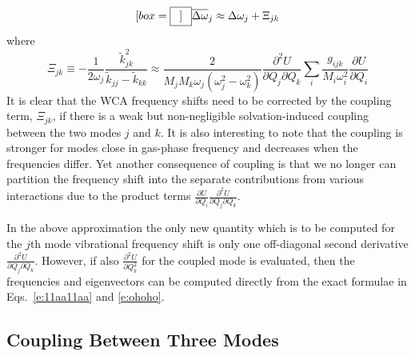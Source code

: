 \documentclass[b5paper,oneside,fleqn,11pt]{book}
\newcommand*{\widebox}[2][0.5em]{\fbox{\hspace{#1}$\displaystyle #2$\hspace{#1}}}
\newcommand{\fderiv}[2]{\ensuremath{
    \frac{\partial #1}{\partial #2}}}
\newcommand{\sderiv}[2]{\ensuremath{
    \frac{\partial^2 #1}{\partial #2^2}
    }}
\newcommand{\sderivd}[3]{\ensuremath{
    \frac{\partial^2 #1}{\partial #2 \partial #3}
    }}
\begin{document}
\begin{refsection}
\begin{equation}[box=\widebox]
   \overline{\Delta\omega}_j \approx \Delta\omega_j + \Xi_{jk}
\end{equation}
%
where
%
\begin{equation}
 \Xi_{jk} \equiv -\frac{1}{2\omega_j} \frac{\tilde{k}_{jk}^2}{\tilde{k}_{jj} - \tilde{k}_{kk}}
 \approx \frac{2}{M_jM_k\omega_j\left(\omega_j^2 - \omega_k^2\right)} \sderivd{U}{Q_j}{Q_k}
 \sum_i \frac{g_{ijk}}{M_i\omega_i^2}  \fderiv{U}{Q_i}  
\end{equation}
%
It is clear that the WCA frequency shifts need to be corrected
by the coupling term, $\Xi_{jk}$, if there 
is a weak but non\hyp{}negligible solvation\hyp{}induced coupling 
between the two modes $j$ and $k$. It is also interesting
to note that the coupling is stronger for modes close in gas\hyp{}phase
frequency
and decreases when the frequencies differ. 
Yet another consequence of coupling is that 
we no longer can partition the frequency shift into the
separate contributions from various interactions due to the
product terms $\fderiv{U}{Q_i}\sderivd{U}{Q_j}{Q_k}$.

In the above approximation the only new quantity which is to
be computed for the $j$th mode vibrational frequency shift 
is only one off\hyp{}diagonal second derivative $\sderivd{U}{Q_j}{Q_k}$.
However, if also $\sderiv{U}{Q_k}$ for the coupled mode
is evaluated, then the frequencies and eigenvectors can be computed
directly from the exact formulae in Eqs.~\eqref{e:11aa11aa}
and \eqref{e:ohoho}.



\subsection{Coupling Between Three Modes\label{s:coupling-between-3-modes}}


\end{refsection}
\end{document}
